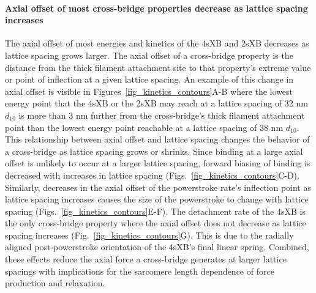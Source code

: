 \documentclass[]{article}
\begin{document}
\paragraph{Axial offset of most cross-bridge properties decrease as lattice spacing increases} %
The axial offset of most energies and kinetics of the 4sXB and 2sXB decreases as lattice spacing grows larger.
The axial offset of a cross-bridge property is the distance from the thick filament attachment site to that property's extreme value or point of inflection at a given lattice spacing. 
An example of this change in axial offset is visible in Figures~\ref{fig_kinetics_contours}A-B where the lowest energy point that the 4sXB or the 2sXB may reach at a lattice spacing of 32 nm $d_{10}$ is more than 3 nm further from the cross-bridge's thick filament attachment point than the lowest energy point reachable at a lattice spacing of 38 nm $d_{10}$.
This relationship between axial offset and lattice spacing changes the behavior of a cross-bridge as lattice spacing grows or shrinks.
Since binding at a large axial offset is unlikely to occur at a larger lattice spacing, forward biasing of binding is decreased with increases in lattice spacing (Figs.~\ref{fig_kinetics_contours}C-D). 
Similarly, decreases in the axial offset of the powerstroke rate's inflection point as lattice spacing increases causes the size of the powerstroke to change with lattice spacing (Figs.~\ref{fig_kinetics_contours}E-F).
The detachment rate of the 4sXB is the only cross-bridge property where the axial offset does not decrease as lattice spacing increases (Fig.~\ref{fig_kinetics_contours}G).
This is due to the radially aligned post-powerstroke orientation of the 4sXB's final linear spring. 
Combined, these effects reduce the axial force a cross-bridge generates at larger lattice spacings with implications for the sarcomere length dependence of force production and relaxation. 
\end{document}
